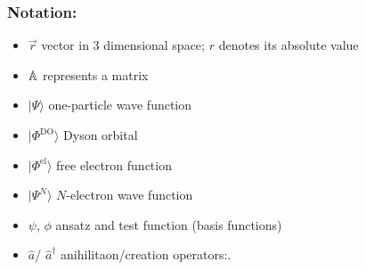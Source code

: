\subsubsection{Notation:}
\begin{itemize}
   \item $\vec{r}$ vector in $3$ dimensional space; $r$ denotes its absolute value
   \item $\mathbb{A}$ represents a matrix
   \item $|\Psi\rangle$ one-particle wave function
   \item $|\Phi^\text{DO}\rangle$ Dyson orbital
   \item $|\Phi^\text{el}\rangle$ free electron function
   \item $|\Psi^N\rangle$ $N$-electron wave function
   \item $\psi$, $\phi$ ansatz and test function (basis functions)
   \item  $\hat{a}$/ $\hat{a}^\dagger$ anihilitaon/creation operators:.
\end{itemize}


